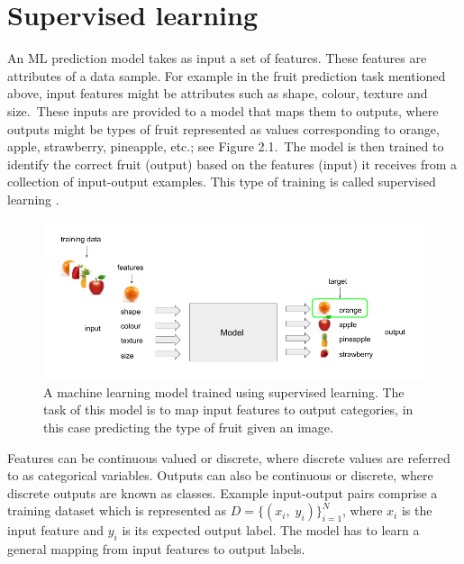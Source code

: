 
\section{Supervised learning}

An ML prediction model takes as input a set of features. These features are attributes of a data sample. For example in the fruit prediction task mentioned above, input features might be attributes such as shape, colour, texture and size.\ These inputs are provided to a model that maps them to outputs, where outputs might be types of fruit represented as values corresponding to orange, apple, strawberry, pineapple, etc.; see Figure 2.1.\ The model is then trained to identify the correct fruit (output) based on the features (input) it receives from a collection of input-output examples. This type of training is called supervised learning \citep{bishop2006pattern}.

\begin{figure}[H]
   	\centering
    	\includegraphics[width=1.0\textwidth, height=0.4\textwidth]{supervised_learning}
	\caption{A machine learning model trained using supervised learning. The task of this model is to map input features to output categories, in this case predicting the type of fruit given an image.}
\end{figure}

\noindent Features can be continuous valued or discrete, where discrete values are referred to as categorical variables. Outputs can also be continuous or discrete, where discrete outputs are known as classes. Example input-output pairs comprise a training dataset which is represented as \begin{math} D = \{(x_i, \; y_i)\}_{i=1}^N \end{math}, where \begin{math} x_i \end{math} is the input feature and \begin{math} y_i \end{math} is its expected output label. The model has to learn a general mapping from input features to output labels. \par

